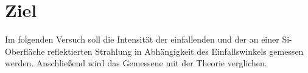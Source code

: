 \section{Ziel}
\label{sec:Ziel}

Im folgenden Versuch soll die Intensität der einfallenden und der an einer Si-Oberfläche reflektierten Strahlung
in Abhängigkeit des Einfallswinkels gemessen werden. Anschließend wird das Gemessene mit der Theorie verglichen.